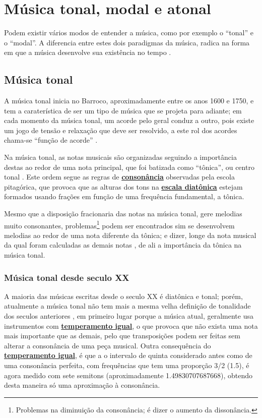 
\section{Música tonal, modal e atonal}
\label{sec:ModosEntenderMusica}
Podem existir vários modos de entender a música, como por exemplo o ``tonal'' e o ``modal''.
A diferencia entre estes dois paradigmas da música, 
radica na forma em que a música desenvolve sua existência no tempo \cite[pp. 155]{arbones2012armonia}.


\subsection{Música tonal}
\label{sec:MusicaTonal}
A música tonal inicia no Barroco, aproximadamente entre os anos 1600 e 1750,
e tem a  caraterística de ser um tipo de  música que se projeta para adiante;
em cada momento da música tonal, um acorde pelo geral conduz a outro,
pois existe um jogo de tensão e relaxação que deve ser resolvido,
a este rol dos acordes chama-se ``função de acorde'' \cite[pp. 155-156]{arbones2012armonia}.


Na música tonal, 
as notas musicais são organizadas seguindo a importância destas ao redor de uma nota  principal,
que foi batizada como ``tônica'', ou centro tonal \cite[pp. 27]{arbones2012armonia}.
Este ordem segue as regras de \hyperref[ref:paginadiatonicanumerica]{\textbf{consonância}} observadas pela escola pitagórica,
que provoca que as alturas dos tons na \hyperref[sec:pos:Diatonica]{\textbf{escala diatônica}} 
estejam formados usando frações em função de uma frequência fundamental, a tônica.

Mesmo que a disposição fracionaria das notas na música tonal, gere melodias muito consonantes,
problemas\footnote{Problemas na diminuição da consonância; é dizer o aumento da dissonância.} 
podem ser encontrados sim se desenvolvem melodias ao redor de uma nota diferente da tônica;
e dizer, longe da nota musical da qual foram calculadas as demais notas \cite[pp. 28]{arbones2012armonia},
de ali a importância da tônica na música tonal.

\subsubsection{Música tonal desde seculo XX}
A maioria das músicas  escritas desde o seculo XX é diatônica e tonal;
porém, atualmente a música tonal não tem mais a mesma velha definição de tonalidade dos seculos anteriores  \cite[pp. 63]{copland1974ouvir},
em primeiro lugar porque a música atual, geralmente usa instrumentos com \hyperref[subsec:tempigual]{\textbf{temperamento igual}},
o que provoca que não exista uma nota mais importante que as demais, 
pelo que transposições podem ser feitas sem alterar a consonância de uma peça musical.
Outra consequência do \hyperref[subsec:tempigual]{\textbf{temperamento igual}},
é que a o intervalo de quinta considerado antes como de uma consonância perfeita,
com frequências que tem uma proporção 3/2 (1.5), é agora medido com sete semitons (aproximadamente 1.49830707687668),
obtendo desta maneira só uma aproximação à consonância.\\




